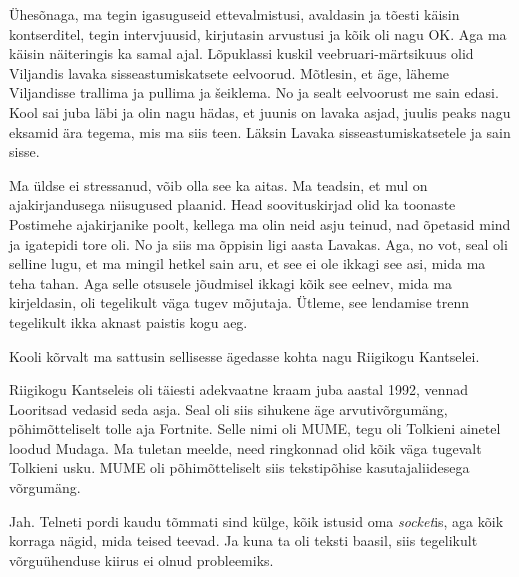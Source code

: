 Ühesõnaga, ma tegin igasuguseid ettevalmistusi, avaldasin ja tõesti käisin 
kontserditel, tegin intervjuusid, kirjutasin arvustusi ja kõik oli nagu OK. 
Aga ma käisin näiteringis ka samal ajal. Lõpuklassi kuskil veebruari-märtsikuus 
olid Viljandis lavaka sisseastumiskatsete 
eelvoorud. Mõtlesin, et äge, läheme Viljandisse trallima ja pullima ja 
šeiklema. No ja sealt eelvoorust me sain edasi. Kool sai juba läbi ja  olin 
nagu hädas, et juunis on lavaka asjad,  juulis peaks nagu eksamid 
ära tegema, mis ma siis teen. Läksin Lavaka sisseastumiskatsetele ja sain sisse.

Ma üldse ei stressanud, võib olla see ka aitas. Ma teadsin, et mul on
ajakirjandusega  niisugused plaanid. Head soovituskirjad olid ka 
toonaste Postimehe ajakirjanike poolt, kellega ma olin neid 
asju teinud, nad õpetasid mind ja igatepidi tore oli. No ja siis ma õppisin 
ligi aasta Lavakas. Aga, no vot, seal oli selline lugu, et ma 
mingil hetkel sain aru, et see ei ole ikkagi see asi, mida ma teha tahan. Aga 
selle otsusele jõudmisel ikkagi  kõik see eelnev, mida ma kirjeldasin, oli 
tegelikult väga tugev mõjutaja. Ütleme,  see lendamise trenn tegelikult ikka aknast 
paistis kogu aeg. 

Kooli kõrvalt ma sattusin sellisesse ägedasse kohta nagu Riigikogu 
Kantselei.


Riigikogu Kantseleis oli täiesti adekvaatne kraam juba aastal 1992, vennad  
Looritsad vedasid seda asja. Seal oli siis  sihukene  äge arvutivõrgumäng, 
põhimõtteliselt tolle aja Fortnite. Selle nimi oli 
MUME, tegu oli Tolkieni ainetel loodud 
Mudaga. Ma tuletan meelde, need ringkonnad olid kõik väga 
tugevalt Tolkieni usku. MUME oli  põhimõtteliselt siis tekstipõhise 
kasutajaliidesega võrgumäng. 


Jah. Telneti pordi kaudu tõmmati sind külge,  kõik istusid oma 
\emph{socket}is, aga kõik korraga nägid, mida teised teevad. Ja kuna ta oli 
teksti baasil, siis tegelikult võrguühenduse kiirus ei olnud probleemiks.

